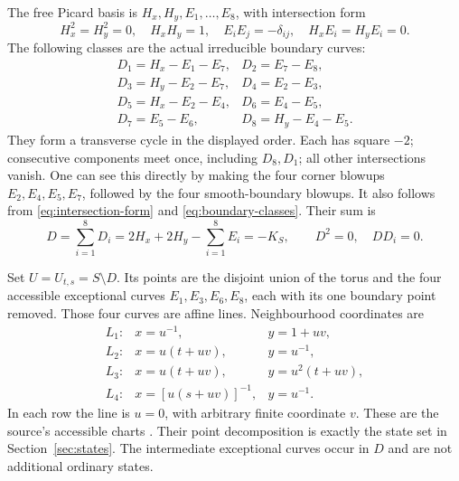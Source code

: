 The free Picard basis is \(H_x,H_y,E_1,\ldots,E_8\), with
intersection form
\begin{equation}\label{eq:intersection-form}
H_x^2=H_y^2=0,\quad H_xH_y=1,\quad
E_iE_j=-\delta_{ij},\quad H_xE_i=H_yE_i=0.
\end{equation}
The following classes are the actual irreducible boundary curves:
\begin{equation}\label{eq:boundary-classes}
\begin{array}{ll}
D_1=H_x-E_1-E_7,&D_2=E_7-E_8,\\
D_3=H_y-E_2-E_7,&D_4=E_2-E_3,\\
D_5=H_x-E_2-E_4,&D_6=E_4-E_5,\\
D_7=E_5-E_6,&D_8=H_y-E_4-E_5.
\end{array}
\end{equation}
They form a transverse cycle in the displayed order. Each has square
\(-2\); consecutive components meet once, including \(D_8,D_1\);
all other intersections vanish. One can see this directly by making
the four corner blowups \(E_2,E_4,E_5,E_7\), followed by the four
smooth-boundary blowups. It also follows from
\eqref{eq:intersection-form} and \eqref{eq:boundary-classes}.
Their sum is
\begin{equation}\label{eq:anticanonical-cycle}
D=\sum_{i=1}^8D_i
=2H_x+2H_y-\sum_{i=1}^8E_i=-K_S,
\qquad D^2=0,\quad DD_i=0.
\end{equation}

Set \(U=U_{t,s}=S\setminus D\). Its points are the disjoint union
of the torus and the four accessible exceptional curves
\(E_1,E_3,E_6,E_8\), each with its one boundary point removed.
Those four curves are affine lines. Neighbourhood coordinates are
\begin{equation}\label{eq:accessible-charts}
\begin{array}{lll}
L_1:&x=u^{-1},&y=1+uv,\\
L_2:&x=u(t+uv),&y=u^{-1},\\
L_3:&x=u(t+uv),&y=u^2(t+uv),\\
L_4:&x=[u(s+uv)]^{-1},&y=u^{-1}.
\end{array}
\end{equation}
In each row the line is \(u=0\), with arbitrary finite coordinate
\(v\). These are the source's accessible charts
\citep[Section 2.1]{JoshiRoffelsen2026}. Their point decomposition is
exactly the state set in Section~\ref{sec:states}. The intermediate
exceptional curves occur in \(D\) and are not additional ordinary
states.

